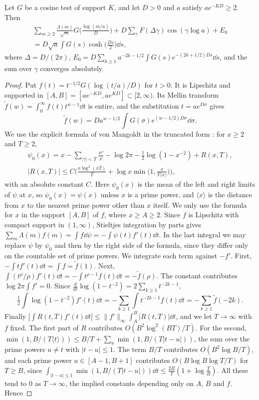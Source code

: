 \documentclass[11pt,colorlinks]{charlie}
\begin{document}
\begin{lemma}\label{lem:explicit}
Let $G$ be a cosine test of support $K$, and let $D>0$ and $a$ satisfy $ae^{-KD}\ge2$. Then
\begin{multline}\label{eq:explicit}
 \sum_{m\ge2}\frac{\Lambda(m)}{\sqrt m}G\Big(\frac{\log(m/a)}D\Big)+D\sum_\gamma F(\Delta\gamma)\cos(\gamma\log a)+E_0\\
 =D\sqrt a\int G(s)\cosh\Big(\frac{Ds}2\Big)\dd s,
\end{multline}
where $\Delta=D/(2\pi)$, $E_0=D\sum_{k\ge1}a^{-2k-1/2}\int G(s)e^{-(2k+1/2)Ds}\dd s$, and the sum over $\gamma$ converges absolutely.
\end{lemma}
\begin{proof}
Put $f(t)=t^{-1/2}G(\log(t/a)/D)$ for $t>0$. It is Lipschitz and supported in $[A,B]=[ae^{-KD},ae^{KD}]\subset[2,\infty)$. Its Mellin transform $\tilde f(w)=\int_0^\infty f(t)t^{w-1}\dd t$ is entire, and the substitution $t=ae^{D\sigma}$ gives
\[
 \tilde f(w)=Da^{w-1/2}\int G(\sigma)e^{(w-1/2)D\sigma}\dd\sigma .
\]
We use the explicit formula of von Mangoldt in the truncated form \cite[Ch.~17]{Davenport}: for $x\ge2$ and $T\ge2$,
\begin{gather*}
 \psi_0(x)=x-\sum_{|\gamma|<T}\frac{x^\rho}\rho-\log2\pi-\tfrac12\log(1-x^{-2})+R(x,T),\\
 |R(x,T)|\le C\Big(\frac{x\log^2(xT)}T+\log x\min\Big(1,\frac x{T\langle x\rangle}\Big)\Big),
\end{gather*}
with an absolute constant $C$. Here $\psi_0(x)$ is the mean of the left and right limits of $\psi$ at $x$, so $\psi_0(x)=\psi(x)$ unless $x$ is a prime power, and $\langle x\rangle$ is the distance from $x$ to the nearest prime power other than $x$ itself. We only use the formula for $x$ in the support $[A,B]$ of $f$, where $x\ge A\ge2$. Since $f$ is Lipschitz with compact support in $(1,\infty)$, Stieltjes integration by parts gives $\sum_m\Lambda(m)f(m)=\int f\dd\psi=-\int\psi(t)f'(t)\dd t$. In the last integral we may replace $\psi$ by $\psi_0$ and then by the right side of the formula, since they differ only on the countable set of prime powers. We integrate each term against $-f'$. First, $-\int tf'(t)\dd t=\int f=\tilde f(1)$. Next, $\int(t^\rho/\rho)f'(t)\dd t=-\int t^{\rho-1}f(t)\dd t=-\tilde f(\rho)$. The constant contributes $\log2\pi\int f'=0$. Since $\frac{d}{dt}\log(1-t^{-2})=2\sum_{k\ge1}t^{-2k-1}$,
\[
 \tfrac12\int\log(1-t^{-2})f'(t)\dd t=-\sum_{k\ge1}\int t^{-2k-1}f(t)\dd t=-\sum_{k\ge1}\tilde f(-2k).
\]
Finally $|\int R(t,T)f'(t)\dd t|\le\|f'\|_\infty\int_A^B|R(t,T)|\dd t$, and we let $T\to\infty$ with $f$ fixed. The first part of $R$ contributes $O(B^2\log^2(BT)/T)$. For the second, $\min(1,B/(T\langle t\rangle))\le B/T+\sum_u\min(1,B/(T|t-u|))$, the sum over the prime powers $u\ne t$ with $|t-u|\le1$. The term $B/T$ contributes $O(B^2\log B/T)$, and each prime power $u\in[A-1,B+1]$ contributes $O(B\log B\log T/T)$ for $T\ge B$, since $\int_{|t-u|\le1}\min(1,B/(T|t-u|))\dd t\le\frac{2B}T(1+\log\frac TB)$. All these tend to $0$ as $T\to\infty$, the implied constants depending only on $A$, $B$ and $f$. Hence

\end{proof}
\end{document}
